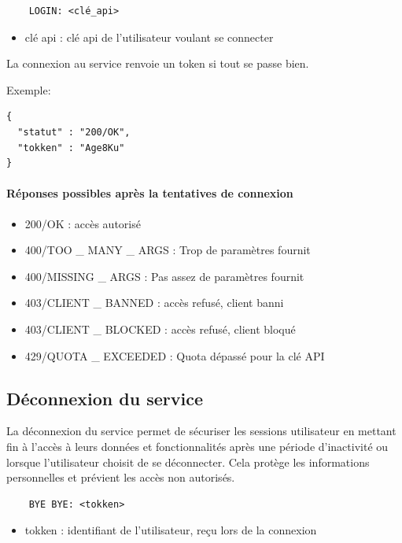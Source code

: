 \documentclass{report}
\begin{document}
\begin{verbatim}
	LOGIN: <clé_api>
\end{verbatim}

\begin{itemize}
	\item clé api : clé api de l'utilisateur voulant se connecter
\end{itemize}

La connexion au service renvoie un token si tout se passe bien.

Exemple:
\begin{verbatim}
{
  "statut" : "200/OK",
  "tokken" : "Age8Ku"
}
\end{verbatim}

\paragraph{Réponses possibles après la tentatives de connexion}

\begin{itemize}
	\item 200/OK : accès autorisé
	\item 400/TOO \_ MANY \_ ARGS : Trop de paramètres fournit
	\item 400/MISSING \_ ARGS : Pas assez de paramètres fournit
	\item 403/CLIENT \_ BANNED : accès refusé, client banni
	\item 403/CLIENT \_ BLOCKED : accès refusé, client bloqué
	\item 429/QUOTA \_ EXCEEDED : Quota dépassé pour la clé API
\end{itemize}

\subsection{Déconnexion du service}

La déconnexion du service permet de sécuriser les sessions utilisateur en mettant fin à l'accès à leurs données et fonctionnalités après une période d'inactivité ou lorsque l'utilisateur choisit de se déconnecter. Cela protège les informations personnelles et prévient les accès non autorisés.

\begin{verbatim}
	BYE BYE: <tokken>
\end{verbatim}

\begin{itemize}
	\item tokken : identifiant de l'utilisateur, reçu lors de la connexion
\end{itemize}
\end{document}
